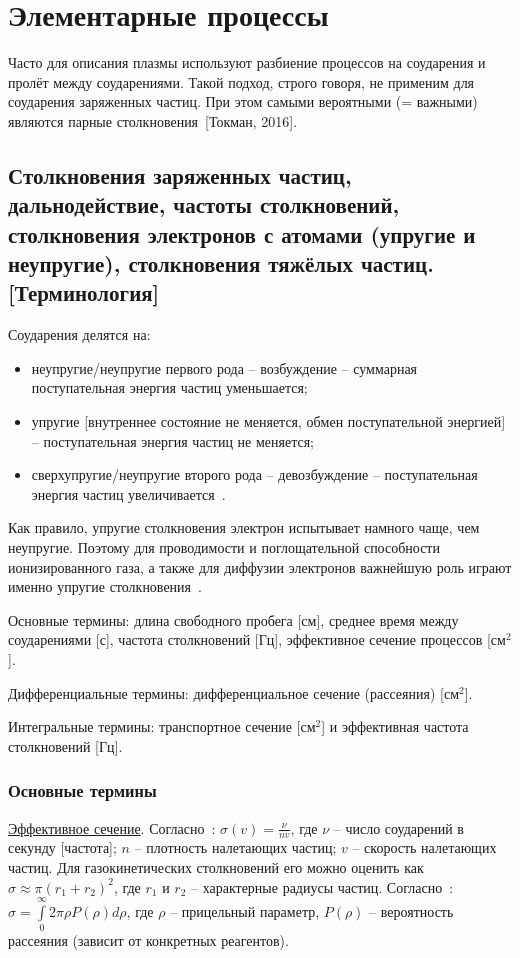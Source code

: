\documentclass[10pt, a4paper]{article}
\newcommand{\Tokman}{~[Токман, 2016]}
\let\stdsection\section
\renewcommand\section{\newpage\stdsection}
\begin{document}
\section{Элементарные процессы}

Часто для описания плазмы используют разбиение процессов на соударения и пролёт между соударениями. Такой подход, строго говоря, не применим для соударения заряженных частиц. При этом самыми вероятными (= важными) являются парные столкновения\Tokman. 

\subsection{Столкновения заряженных частиц, дальнодействие, частоты столкновений, столкновения электронов с атомами (упругие и неупругие), столкновения тяжёлых частиц. [Терминология]}

Соударения делятся на:
\begin{itemize}
	\item неупругие/неупругие первого рода -- возбуждение -- суммарная поступательная энергия частиц уменьшается;
	\item упругие [внутреннее состояние не меняется, обмен поступательной энергией] -- поступательная энергия частиц не меняется;
	\item сверхупругие/неупругие второго рода -- девозбуждение -- поступательная энергия частиц увеличивается~\cite{raizer}.
\end{itemize}

Как правило, упругие столкновения электрон испытывает намного чаще, чем неупругие. Поэтому для проводимости и поглощательной способности ионизированного газа, а также для диффузии электронов важнейшую роль играют именно упругие столкновения~\cite{raizer}.

Основные термины: длина свободного пробега [см], среднее время между соударениями [с], частота столкновений [Гц], эффективное сечение процессов [см$^2$]. 

Дифференциальные термины: дифференциальное сечение (рассеяния) [см$^2$].

Интегральные термины: транспортное сечение [см$^2$] и эффективная частота столкновений [Гц].

\subsubsection{Основные термины}

\uline{Эффективное сечение}. Согласно~\cite{raizer}: $\sigma(v) = \frac{\nu}{nv}$, где $\nu$ -- число соударений в секунду [частота]; $n$ -- плотность налетающих частиц; $v$ -- скорость налетающих частиц. Для газокинетических столкновений его можно оценить как $\sigma \approx \pi(r_1+r_2)^2$, где $r_1$ и $r_2$ -- характерные радиусы частиц. Согласно~\cite{astap}: $\sigma=\int\limits_{0}^{\infty} 2\pi \rho P(\rho) d\rho$, где $\rho$ -- прицельный параметр, $P(\rho)$ -- вероятность рассеяния (зависит от конкретных реагентов). 
\end{document}

